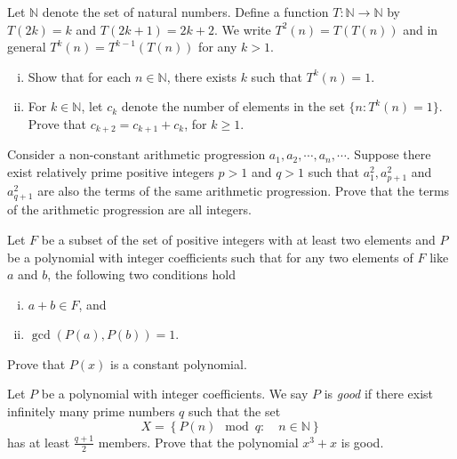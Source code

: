 \begin{problem}
	Let $\mathbb{N}$ denote the set of natural numbers. Define a function $T:\mathbb{N}\rightarrow\mathbb{N}$ by $T(2k)=k$ and $T(2k+1)=2k+2$. We write $T^2(n)=T(T(n))$ and in general $T^k(n)=T^{k-1}(T(n))$ for any $k>1$.
	\begin{enumerate}[(i)]
		\item Show that for each $n\in\mathbb{N}$, there exists $k$ such that $T^k(n)=1$.
		\item For $k\in\mathbb{N}$, let $c_k$ denote the number of elements in the set $\{n: T^k(n)=1\}$. Prove that $c_{k+2}=c_{k+1}+c_k$, for $k\ge 1$.
	\end{enumerate}
\end{problem}

\begin{problem}
	Consider a non-constant arithmetic progression $a_1, a_2,\cdots, a_n,\cdots$. Suppose there exist relatively prime positive integers $p>1$ and $q>1$ such that $a_1^2, a_{p+1}^2$ and $a_{q+1}^2$ are also the terms of the same arithmetic progression. Prove that the terms of the arithmetic progression are all integers. %
\end{problem}

\begin{problem}
	Let $F$ be a subset of the set of positive integers with at least two elements and $P$ be a polynomial with integer coefficients such that for any two elements of $F$ like $a$ and $b$, the following two conditions hold
	\begin{enumerate}[(i)]
		\item $a+b \in F$, and
		\item $\gcd(P(a),P(b))=1$.
	\end{enumerate}
	Prove that $P(x)$ is a constant polynomial. %
\end{problem}

\begin{problem}
	Let $P$ be a polynomial with integer coefficients. We say $P$ is \textit{good} if there exist infinitely many prime numbers $q$ such that the set $$X=\left\{P(n) \mod q : \quad n\in \mathbb N\right\}$$
	has at least $\frac{q+1}{2}$ members. Prove that the polynomial $x^3+x$ is good. %
\end{problem}

